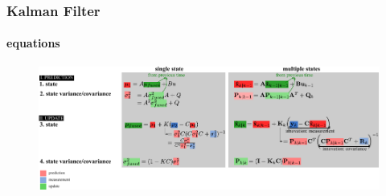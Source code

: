


\begin{frame}
\frametitle{Kalman Filter}
\framesubtitle{equations}
\logoCSIPCPL\mypagenum
	\begin{figure}
		\includegraphics[width=1.0\textwidth]{figs/TRK_KalmanFilter_equations.pdf}
	\end{figure}
\end{frame}

